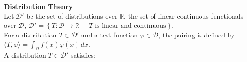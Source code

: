 \documentclass[8pt]{article}
\begin{document}
\noindent \textbf{Distribution Theory} \\
Let $\mathcal{D}'$ be the set of distributions over $\mathbb{R}$, the set of linear continuous functionals over $\mathcal{D}$,
$
\mathcal{D}' = \left\{ T \colon \mathcal{D} \to \mathbb{R} \;\middle|\; T \text{ is linear and continuous} \right\}.
$\\
For a distribution $T \in \mathcal{D}'$ and a test function $\varphi \in \mathcal{D}$, the pairing is defined by
$
\langle T, \varphi \rangle = \int_{\Omega} f(x) \varphi(x) \, dx.
$
\\
A distribution $T \in \mathcal{D}'$ satisfies: \vspace{-13px}\hspace{170px}
\\ \vspace{-5px}
\end{document}
